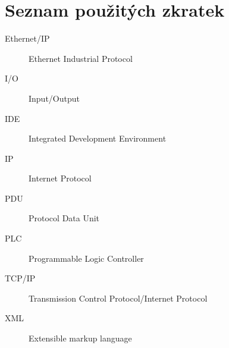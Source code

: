 \chapter{Seznam použitých zkratek}
\begin{description}
	\item[Ethernet/IP] Ethernet Industrial Protocol
	\item[I/O] Input/Output
	\item[IDE] Integrated Development Environment 
	\item[IP] Internet Protocol 
	\item[PDU] Protocol Data Unit 
	\item[PLC] Programmable Logic Controller
	\item[TCP/IP] Transmission Control Protocol/Internet Protocol 
	\item[XML] Extensible markup language
\end{description}